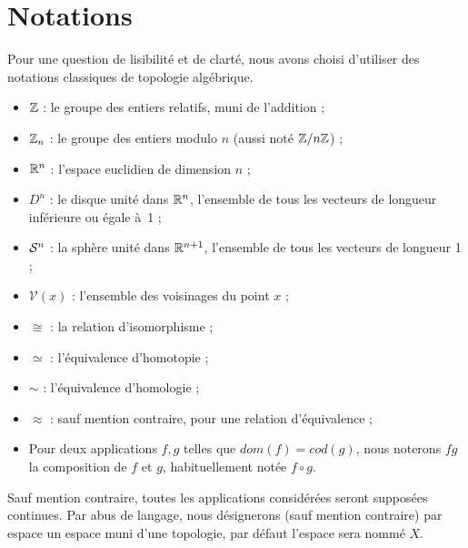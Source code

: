 \section{Notations}
Pour une question de lisibilité et de clarté, nous avons choisi d'utiliser des notations classiques de topologie algébrique.
\begin{itemize}
    \item $\mathbb{Z}$ : le groupe des entiers relatifs, muni de l'addition ;
    \item $\mathbb{Z}_n$ : le groupe des entiers modulo $n$ (aussi noté $\mathbb{Z}/n\mathbb{Z}$) ;
    \item $\mathbb{R}^n$ : l'espace euclidien de dimension $n$ ;
    \item $D^n$ : le disque unité dans $\mathbb{R}^n$, l'ensemble de tous les vecteurs de longueur inférieure ou égale à~1 ;
    \item $\mathcal{S}^{n}$ : la sphère unité dans $\mathbb{R}^{n+1}$, l'ensemble de tous les vecteurs de longueur 1 ;
    \item $\mathcal{V}(x)$ : l'ensemble des voisinages du point $x$ ;
    \item $\cong$ : la relation d'isomorphisme  ;
    \item $\simeq$ : l'équivalence d'homotopie ;
    \item $\sim$ : l'équivalence d'homologie ;
    \item $\approx$ : sauf mention contraire, pour une relation d'équivalence ;
    \item Pour deux applications $f,g$ telles que $dom(f)=cod(g)$, nous noterons $fg$ la composition de $f$ et $g$, habituellement notée $f\circ g$.
\end{itemize}

Sauf mention contraire, toutes les applications considérées seront supposées continues. Par abus de langage, nous désignerons (sauf mention contraire) par espace un espace muni d'une topologie, par défaut l'espace sera nommé $X$.